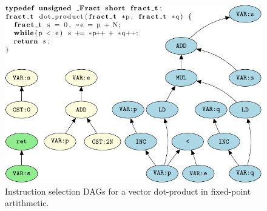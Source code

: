 \begin{figure}[ht]
\begin{center}


    \includegraphics{fig/pgf-fig003}
  \end{center}
  \caption{Instruction selection DAGs for a vector dot-product in
    fixed-point artithmetic.}\label{fig:dot_product}
\end{figure}

